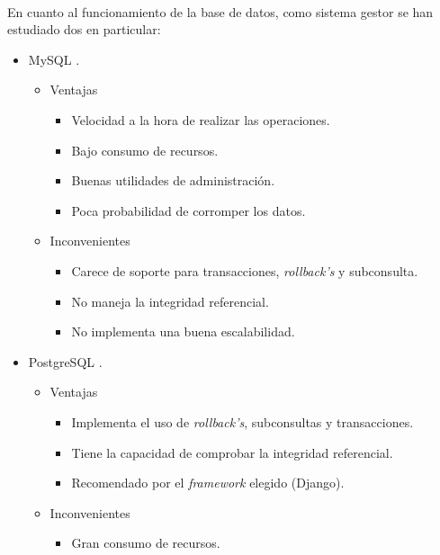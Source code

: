    \paragraph{}En cuanto al funcionamiento de la base de datos, como sistema
   gestor se han estudiado dos en particular:

   \begin{itemize}
    \item MySQL \cite{mysql}.
      \begin{itemize}
         \item Ventajas
            \begin{itemize}
             \item Velocidad a la hora de realizar las operaciones.
             \item Bajo consumo de recursos.
             \item Buenas utilidades de administración.
             \item Poca probabilidad de corromper los datos.
            \end{itemize}
         \item Inconvenientes
            \begin{itemize}
             \item Carece de soporte para transacciones, \textit{rollback's} y
                   subconsulta.
             \item No maneja la integridad referencial.
             \item No implementa una buena escalabilidad.
            \end{itemize}
      \end{itemize}
    \item PostgreSQL \cite{postgresql}.
      \begin{itemize}
         \item Ventajas
            \begin{itemize}
             \item Implementa el uso de \textit{rollback's}, subconsultas y
                   transacciones.
             \item Tiene la capacidad de comprobar la integridad referencial.
             \item Recomendado por el \textit{framework} elegido (Django).
            \end{itemize}
         \item Inconvenientes
            \begin{itemize}
             \item Gran consumo de recursos.

\end{itemize}
\end{itemize}
\end{itemize}
